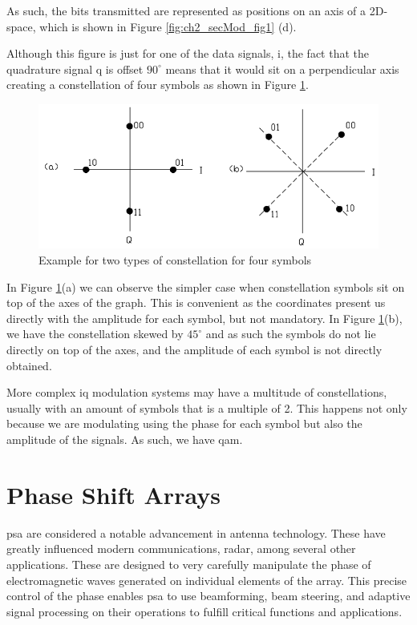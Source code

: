 \par As such, the bits transmitted are represented as positions on an axis of a 2D-space, which is  shown in Figure \ref{fig:ch2_secMod_fig1} (d).

\par Although this figure is just for one of the data signals, \ac{i}, the fact that the quadrature signal \ac{q} is offset $90^{\circ}$ means that it would sit on a perpendicular axis creating a constellation of four symbols as shown in Figure \ref{fig:ch2_secMod_fig2}.

\begin{figure}[H]
    \vspace*{0cm}
    \centering
	\includegraphics[width=0.5\linewidth]{figs/ch2_secMod_fig2.png}
    \caption{Example for two types of constellation for four symbols \cite{Ha2010TheorySystems}}
    \label{fig:ch2_secMod_fig2}
\end{figure}

\par In Figure \ref{fig:ch2_secMod_fig2}(a) we can observe the simpler case when constellation symbols sit on top of the axes of the graph. This is convenient as the coordinates present us directly with the amplitude for each symbol, but not mandatory. In Figure  \ref{fig:ch2_secMod_fig2}(b), we have the constellation skewed by $45^{\circ}$ and as such the symbols do not lie directly on top of the axes, and the amplitude of each symbol is not directly obtained.

\par More complex \ac{iq} modulation systems may have a multitude of constellations, usually with an amount of symbols that is a multiple of 2. This happens not only because we are modulating using the phase for each symbol but also the amplitude of the signals. As such, we have \ac{qam}.

\section{Phase Shift Arrays}
\label{section:ch2_psa}

\par \ac{psa} are considered a notable advancement in antenna technology. These have greatly influenced modern communications, radar, among several other applications. These are designed to very  carefully manipulate the phase of electromagnetic waves generated on individual elements of the array. This precise control of the phase enables \ac{psa} to use beamforming, beam steering, and adaptive signal processing on their operations to fulfill critical functions and applications.

